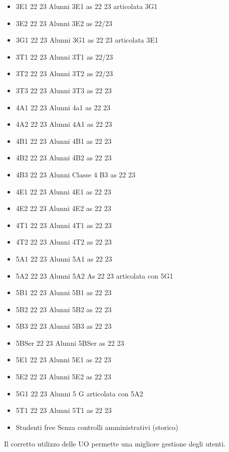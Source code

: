 \begin{itemize}
\begin{itemize}
\begin{itemize}
	\item 3E1 22 23
	Alunni 3E1 as 22 23 articolata 3G1	
	\item 3E2 22 23
	Alunni 3E2 as 22/23	
	\item 3G1 22 23
	Alunni 3G1 as 22 23 articolata 3E1	
	\item 3T1 22 23
	Alunni 3T1 as 22/23	
	\item 3T2 22 23
	Alunni 3T2 as 22/23	
	\item 3T3 22 23
	Alunni 3T3 as 22 23	
	\item 4A1 22 23
	Alunni 4a1 as 22 23	
	\item 4A2 22 23
	Alunni 4A1 as 22 23	
	\item 4B1 22 23
	Alunni 4B1 as 22 23	
	\item 4B2 22 23
	Alunni 4B2 as 22 23	
	\item 4B3 22 23
	Alunni Classe 4 B3 as 22 23	
	\item 4E1 22 23
	Alunni 4E1 as 22 23	
	\item 4E2 22 23
	Alunni 4E2 as 22 23	
	\item 4T1 22 23
	Alunni 4T1 as 22 23	
	\item 4T2 22 23
	Alunni 4T2 as 22 23	
	\item 5A1 22 23
	Alunni 5A1 as 22 23	
	\item 5A2 22 23
	Alunni 5A2 As 22 23 articolata con 5G1	
	\item 5B1 22 23
	Alunni 5B1 as 22 23	
	\item 5B2 22 23
	Alunni 5B2 as 22 23	
	\item 5B3 22 23
	Alunni 5B3 as 22 23	
	\item 5BSer 22 23
	Alunni 5BSer as 22 23	
	\item 5E1 22 23
	Alunni 5E1 as 22 23	
	\item 5E2 22 23
	Alunni 5E2 as 22 23	
	\item 5G1 22 23
	Alunni 5 G articolata con 5A2	
	\item 5T1 22 23
	Alunni 5T1 as 22 23	
	\item Studenti free
	Senza controlli amministrativi (storico)
\end{itemize}
	\end{itemize}
\end{itemize} 

Il corretto utilizzo delle UO permette  una  migliore gestione degli utenti.